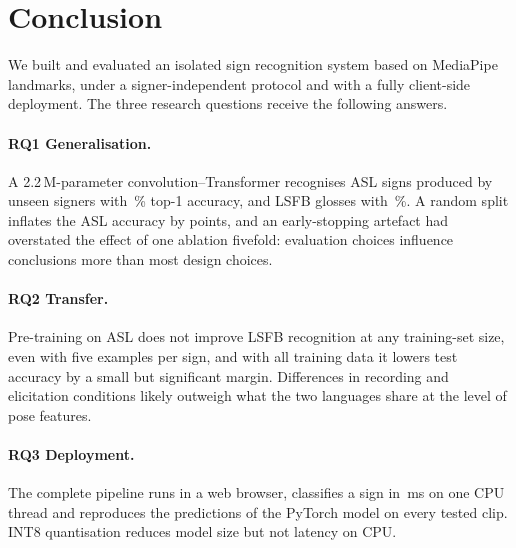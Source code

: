 \section{Conclusion}
\label{sec:conclusion}

We built and evaluated an isolated sign recognition system based on MediaPipe landmarks, under a
signer-independent protocol and with a fully client-side deployment. The three research questions
receive the following answers.

\paragraph{RQ1 Generalisation.} A 2.2\,M-parameter convolution--Transformer recognises
\numAslClasses{} ASL signs produced by unseen signers with \numTrTestTop{}\,\% top-1 accuracy, and
\numLsfbClasses{} LSFB glosses with \numLsfbScratchTest{}\,\%. A random split inflates the ASL
accuracy by \numLeakGap{} points, and an early-stopping artefact had overstated the effect of one
ablation fivefold: evaluation choices influence conclusions more than most design choices.

\paragraph{RQ2 Transfer.} Pre-training on ASL does not improve LSFB recognition at any
training-set size, even with five examples per sign, and with all training data it lowers test
accuracy by a small but significant margin. Differences in recording and elicitation
conditions likely outweigh what the two languages share at the level of pose features.

\paragraph{RQ3 Deployment.} The complete pipeline runs in a web browser, classifies a sign in
\numFpBrowser{}\,ms on one CPU thread and reproduces the predictions of the PyTorch model on every
tested clip. INT8 quantisation reduces model size but not latency on CPU.

